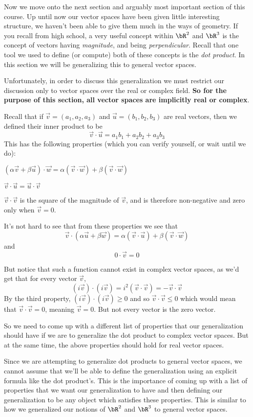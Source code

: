 Now we move onto the next section and arguably most important section of this course.
Up until now our vector spaces have been given little interesting structure, we haven't been able to give them much in the ways of geometry.
If you recall from high school, a very useful concept within $\bR^2$ and $\bR^3$ is the concept of vectors having \emph{magnitude}, and being \emph{perpendicular}.
Recall that one tool we used to define (or compute) both of these concepts is the \emph{dot product}.
In this section we will be generalizing this to general vector spaces.

Unfortunately, in order to discuss this generalization we must restrict our discussion only to vector spaces over the real or complex field.
\textbf{So for the purpose of this section, all vector spaces are implicitly real or complex}.

Recall that if $\vec v=(a_1,a_2,a_3)$ and $\vec u=(b_1,b_2,b_3)$ are real vectors, then we defined their inner product to be
\[ \vec v\cdot\vec u = a_1b_1 + a_2b_2 + a_3b_3 \]
This has the following properties (which you can verify yourself, or wait until we do):
\benum
    \item $(\alpha\vec v+\beta\vec u)\cdot\vec w=\alpha(\vec v\cdot\vec w)+\beta(\vec v\cdot\vec w)$
    \item $\vec v\cdot\vec u=\vec u\cdot\vec v$
    \item $\vec v\cdot\vec v$ is the square of the magnitude of $\vec v$, and is therefore non-negative and zero only when $\vec v=0$.
\eenum

It's not hard to see that from these properties we see that
\[ \vec v\cdot(\alpha\vec u+\beta\vec w)=\alpha(\vec v\cdot\vec u) + \beta(\vec v\cdot\vec w) \]
and
\[ 0\cdot\vec v=0 \]

But notice that such a function cannot exist in complex vector spaces, as we'd get that for every vector $\vec v$,
\[ (i\vec v)\cdot(i\vec v) = i^2(\vec v\cdot\vec v) = -\vec v\cdot\vec v \]
By the third property, $(i\vec v)\cdot(i\vec v)\geq0$ and so $\vec v\cdot\vec v\leq0$ which would mean that $\vec v\cdot\vec v=0$, meaning $\vec v=0$.
But not every vector is the zero vector.

So we need to come up with a different list of properties that our generalization should have if we are to generalize the dot product to complex vector spaces.
But at the same time, the above properties should hold for real vector spaces.

\begin{note}

    Since we are attempting to generalize dot products to general vector spaces, we cannot assume that we'll be able to define the generalization using an explicit formula like the dot product's.
    This is the importance of coming up with a list of properties that we want our generalization to have and then defining our generalization to be any object which satisfies these properties.
    This is similar to how we generalized our notions of $\bR^2$ and $\bR^3$ to general vector spaces.

\end{note}

